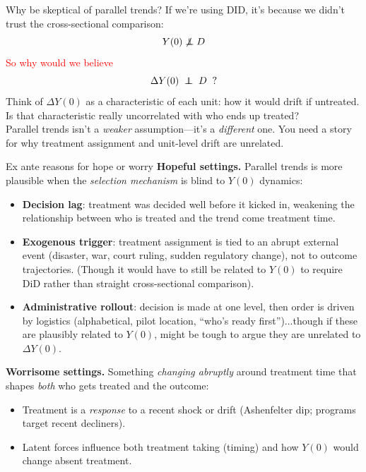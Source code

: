 \documentclass[xcolor=dvipsnames]{beamer}
\newcommand\indep{\protect\mathpalette{\protect\independenT}{\perp}}
\def\independenT#1#2{\mathrel{\rlap{$#1#2$}\mkern2mu{#1#2}}}
\begin{document}
\begin{frame}{Why be skeptical of parallel trends?}
\small
If we're using DID, it's because we didn't trust the cross-sectional comparison:\\

\[ Y(0) \not\indep D \]
\bigskip
{}\textcolor{Red}{So why would we believe}\\

\[ \Delta Y(0) \;\indep\; D \;\;?\]
\bigskip
{} Think of $\Delta Y(0)$ as a characteristic of each unit: how it would drift if untreated. Is that characteristic really uncorrelated with who ends up treated?\\

\bigskip
{} Parallel trends isn't a \textit{weaker} assumption---it's a \textit{different} one. You need a story for why treatment assignment and unit-level drift are unrelated.
\end{frame}


\begin{frame}{Ex ante reasons for hope or worry}
\small
\textbf{Hopeful settings.} Parallel trends is more plausible when the \textit{selection mechanism} is blind to $Y(0)$ dynamics:
\begin{itemize}
\footnotesize
\item<1-> \textbf{Decision lag}: treatment was decided well before it kicked in, weakening the relationship between who is treated and the trend come treatment time. 
\item<2-> \textbf{Exogenous trigger}: treatment assignment is tied to an abrupt external event (disaster, war, court ruling, sudden regulatory change), not to outcome trajectories. (Though it would have to still be related to $Y(0)$ to require DiD rather than straight cross-sectional comparison). 
\item<3-> \textbf{Administrative rollout}: decision is made at one level, then order is driven by logistics (alphabetical, pilot location, ``who's ready first'')...though if these are plausibly related to $Y(0)$, might be tough to argue they are unrelated to $\Delta Y(0)$.
\end{itemize}
\bigskip
{} \textbf{Worrisome settings.} Something \textit{changing abruptly} around treatment time that shapes \textit{both} who gets treated and the outcome:
\begin{itemize}
\footnotesize
\item<6-> Treatment is a \textit{response} to a recent shock or drift (Ashenfelter dip; programs target recent decliners).
\item<7-> Latent forces influence both treatment taking (timing) and how $Y(0)$ would change absent treatment.
\end{itemize}
\end{frame}
\end{document}
